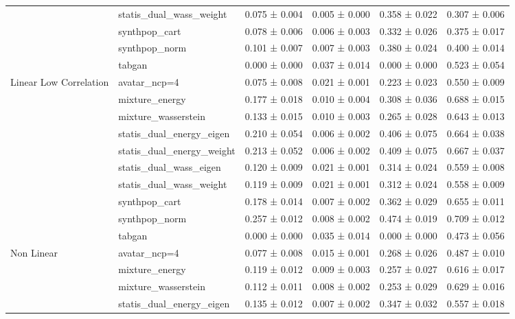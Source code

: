 \begin{tabular}{llllll}
 & statis_dual_wass_weight & 0.075 ± 0.004 & 0.005 ± 0.000 & 0.358 ± 0.022 & 0.307 ± 0.006 \\
 & synthpop_cart & 0.078 ± 0.006 & 0.006 ± 0.003 & 0.332 ± 0.026 & 0.375 ± 0.017 \\
 & synthpop_norm & \cellcolor{myred}0.101 ± 0.007 & 0.007 ± 0.003 & \cellcolor{myred}0.380 ± 0.024 & 0.400 ± 0.014 \\
 & tabgan & \cellcolor{mygreen}0.000 ± 0.000 & \cellcolor{myred}0.037 ± 0.014 & \cellcolor{mygreen}0.000 ± 0.000 & \cellcolor{myred}0.523 ± 0.054 \\
\cline{1-6}
\multirow[t]{10}{*}{Linear 
 Low Correlation} & avatar_ncp=4 & 0.075 ± 0.008 & 0.021 ± 0.001 & 0.223 ± 0.023 & 0.550 ± 0.009 \\
 & mixture_energy & 0.177 ± 0.018 & 0.010 ± 0.004 & 0.308 ± 0.036 & 0.688 ± 0.015 \\
 & mixture_wasserstein & 0.133 ± 0.015 & 0.010 ± 0.003 & 0.265 ± 0.028 & 0.643 ± 0.013 \\
 & statis_dual_energy_eigen & 0.210 ± 0.054 & \cellcolor{mygreen}0.006 ± 0.002 & 0.406 ± 0.075 & 0.664 ± 0.038 \\
 & statis_dual_energy_weight & 0.213 ± 0.052 & \cellcolor{mygreen}0.006 ± 0.002 & 0.409 ± 0.075 & 0.667 ± 0.037 \\
 & statis_dual_wass_eigen & 0.120 ± 0.009 & 0.021 ± 0.001 & 0.314 ± 0.024 & 0.559 ± 0.008 \\
 & statis_dual_wass_weight & 0.119 ± 0.009 & 0.021 ± 0.001 & 0.312 ± 0.024 & 0.558 ± 0.009 \\
 & synthpop_cart & 0.178 ± 0.014 & 0.007 ± 0.002 & 0.362 ± 0.029 & 0.655 ± 0.011 \\
 & synthpop_norm & \cellcolor{myred}0.257 ± 0.012 & 0.008 ± 0.002 & \cellcolor{myred}0.474 ± 0.019 & \cellcolor{myred}0.709 ± 0.012 \\
 & tabgan & \cellcolor{mygreen}0.000 ± 0.000 & \cellcolor{myred}0.035 ± 0.014 & \cellcolor{mygreen}0.000 ± 0.000 & \cellcolor{mygreen}0.473 ± 0.056 \\
\cline{1-6}
\multirow[t]{10}{*}{Non Linear} & avatar_ncp=4 & 0.077 ± 0.008 & 0.015 ± 0.001 & 0.268 ± 0.026 & \cellcolor{mygreen}0.487 ± 0.010 \\
 & mixture_energy & 0.119 ± 0.012 & 0.009 ± 0.003 & 0.257 ± 0.027 & 0.616 ± 0.017 \\
 & mixture_wasserstein & 0.112 ± 0.011 & 0.008 ± 0.002 & 0.253 ± 0.029 & 0.629 ± 0.016 \\
 & statis_dual_energy_eigen & 0.135 ± 0.012 & \cellcolor{mygreen}0.007 ± 0.002 & 0.347 ± 0.032 & 0.557 ± 0.018 \\

\end{tabular}
